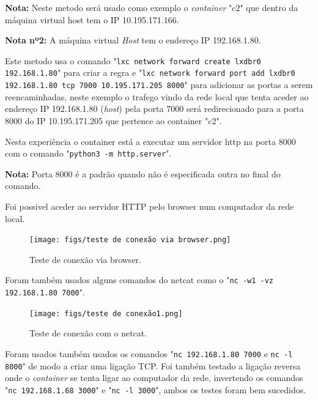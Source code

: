 \textbf{Nota:} Neste metodo será usado como exemplo o \textit{container} "c2" que
dentro da máquina virtual host tem o IP 10.195.171.166.

\textbf{Nota nº2:} A máquina virtual \textit{Host} tem o endereço IP 192.168.1.80.

Este metodo usa o comando "\texttt{lxc network forward create lxdbr0 192.168.1.80}"
para criar a regra e "\texttt{lxc network forward port add lxdbr0 192.168.1.80 tcp 7000 10.195.171.205 8000}"
para adicionar as portas a serem reencaminhadas, neste exemplo o trafego vindo da
rede local que tenta aceder ao endereço IP 192.168.1.80 (\textit{host}) pela porta 7000 será redirecionado
para a porta 8000 do IP 10.195.171.205 que pertence ao container "c2".

Nesta experiência o container está a executar um servidor http na porta 8000
com o comando "\texttt{python3 -m http.server}".


\textbf{Nota:} Porta 8000 é a padrão quando não é especificada outra no final do comando.


Foi possivel aceder ao servidor HTTP pelo browser num computador da rede local.

\begin{figure}[H]
\begin{center}
\texttt{[image: figs/teste de conexão via browser.png]}
\caption{Teste de conexão via browser.}
\label{fig:bookstack}
\end{center}
\end{figure}


Foram também usados alguns comandos do netcat como o "\texttt{nc -w1 -vz 192.168.1.80 7000}".

\begin{figure}[ht]
\begin{center}
\texttt{[image: figs/teste de conexão1.png]}
\caption{Teste de conexão com o netcat.}
\label{fig:bookstack}
\end{center}
\end{figure}

Foram usados também usados os comandos "\texttt{nc 192.168.1.80 7000} e \texttt{nc -l 8000}"
de modo a criar uma ligação TCP. Foi também testado a ligação reversa
onde o \textit{container} se tenta ligar ao computador da rede, invertendo os comandos
"\texttt{nc 192.168.1.68 3000}" e "\texttt{nc -l 3000}", ambos os testes foram bem
sucedidos.







